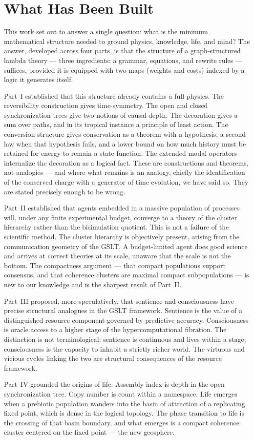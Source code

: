 \chapter*{What Has Been Built}

This work set out to answer a single question: what is the minimum
mathematical structure needed to ground physics, knowledge, life,
and mind?
The answer, developed across four parts, is that the structure of a
graph-structured lambda theory --- three ingredients: a grammar,
equations, and rewrite rules --- suffices, provided it is equipped
with two maps (weights and costs) indexed by a logic it generates
itself.

Part~I established that this structure already contains a full
physics.
The reversibility construction gives time-symmetry.
The open and closed synchronization trees give two notions of
causal depth.
The decoration gives a sum over paths, and in its tropical
instance a principle of least action.
The conversion structure gives conservation as a theorem with a
hypothesis, a second law when that hypothesis fails, and a lower
bound on how much history must be retained for energy to remain a
state function.
The extended modal operators internalize the decoration as a
logical fact.
These are constructions and theorems, not analogies --- and where
what remains is an analogy, chiefly the identification of the
conserved charge with a generator of time evolution, we have said
so.
They are stated precisely enough to be wrong.

Part~II established that agents embedded in a massive population
of processes will, under any finite experimental budget, converge
to a theory of the cluster hierarchy rather than the bisimulation
quotient.
This is not a failure of the scientific method.
The cluster hierarchy is objectively present, arising from the
communication geometry of the GSLT.
A budget-limited agent does good science and arrives at correct
theories at its scale, unaware that the scale is not the bottom.
The compactness argument --- that compact populations support
consensus, and that coherence clusters are maximal compact
subpopulations --- is new to our knowledge and is the sharpest
result of Part~II.

Part~III proposed, more speculatively, that sentience and
consciousness have precise structural analogues in the GSLT
framework.
Sentience is the value of a distinguished resource component
governed by predictive accuracy.
Consciousness is oracle access to a higher stage of the
hypercomputational fibration.
The distinction is not terminological: sentience is continuous
and lives within a stage; consciousness is the capacity to
inhabit a strictly richer world.
The virtuous and vicious cycles linking the two are structural
consequences of the resource framework.

Part~IV grounded the origins of life.
Assembly index is depth in the open synchronization tree.
Copy number is count within a namespace.
Life emerges when a prebiotic population wanders into the basin
of attraction of a replicating fixed point, which is dense in
the logical topology.
The phase transition to life is the crossing of that basin
boundary, and what emerges is a compact coherence cluster
centered on the fixed point --- the new geosphere.
